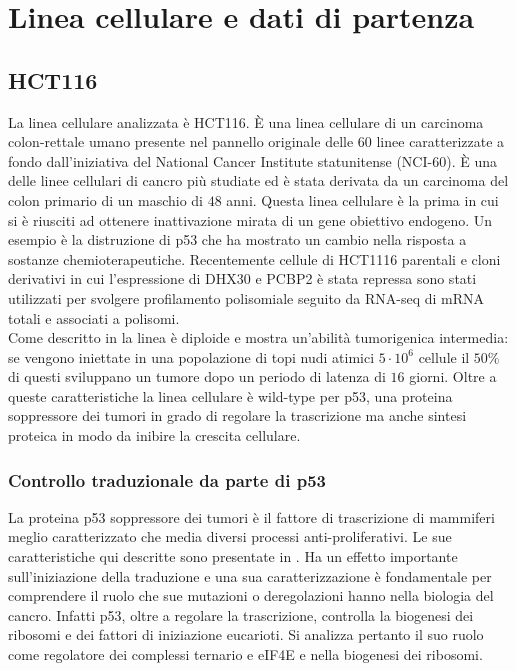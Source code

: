 \chapter{Linea cellulare e dati di partenza}
\label{cha:cell_lines}

\section{HCT116}
\label{sec:hct116}
La linea cellulare analizzata \`e HCT116.
\`E una linea cellulare di un carcinoma colon-rettale umano presente nel pannello originale delle $60$ linee caratterizzate a fondo dall'iniziativa del National Cancer Institute statunitense (NCI-$60$).
\`E una delle linee cellulari di cancro pi\`u studiate ed \`e stata derivata da un carcinoma del colon primario di un maschio di $48$ anni.
Questa linea cellulare \`e la prima in cui si \`e riusciti ad ottenere inattivazione mirata di un gene obiettivo endogeno.
Un esempio \`e la distruzione di p53 che ha mostrato un cambio nella risposta a sostanze chemioterapeutiche.\cite{p53disruption}
Recentemente cellule di HCT1116 parentali e cloni derivativi in cui l'espressione di DHX30 e PCBP2 \`e stata repressa sono stati utilizzati per svolgere profilamento polisomiale seguito da RNA-seq di mRNA totali e associati a polisomi.\\
Come descritto in \cite{hct116} la linea \`e diploide e mostra un'abilit\`a tumorigenica intermedia: se vengono iniettate in una popolazione di topi nudi atimici $5\cdot 10^6$ cellule il $50\%$ di questi sviluppano un tumore dopo un periodo di latenza di $16$ giorni.
Oltre a queste caratteristiche la linea cellulare \`e wild-type per p53, una proteina soppressore dei tumori in grado di regolare la trascrizione ma anche sintesi proteica in modo da inibire la crescita cellulare.

  \subsection{Controllo traduzionale da parte di p53}
  \label{subsec:p53}
  La proteina p53 soppressore dei tumori \`e il fattore di trascrizione di mammiferi meglio caratterizzato che media diversi processi anti-proliferativi.
  Le sue caratteristiche qui descritte sono presentate in \cite{transconp53}.
  Ha un effetto importante sull'iniziazione della traduzione e una sua caratterizzazione \`e fondamentale per comprendere il ruolo che sue mutazioni o deregolazioni hanno nella biologia del cancro.
  Infatti p53, oltre a regolare la trascrizione, controlla la biogenesi dei ribosomi e dei fattori di iniziazione eucarioti.
  Si analizza pertanto il suo ruolo come regolatore dei complessi ternario e eIF4E e nella biogenesi dei ribosomi.

